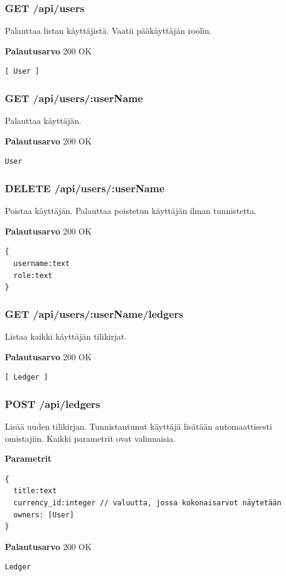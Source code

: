 \documentclass[a4paper,parskip=half]{scrartcl}
\begin{document}
\subsubsection{GET /api/users}
Palauttaa listan käyttäjistä. Vaatii pääkäyttäjän roolin.

\textbf{Palautusarvo}
200 OK
\begin{Verbatim}
[ User ]
\end{Verbatim}

\subsubsection{GET /api/users/:userName}
Palauttaa käyttäjän.

\textbf{Palautusarvo}
200 OK
\begin{Verbatim}
User
\end{Verbatim}

\subsubsection{DELETE /api/users/:userName}
Poistaa käyttäjän. Palauttaa poistetun käyttäjän ilman tunnistetta.

\textbf{Palautusarvo}
200 OK
\begin{Verbatim}
{
  username:text
  role:text
}
\end{Verbatim}

\subsubsection{GET /api/users/:userName/ledgers}
Listaa kaikki käyttäjän tilikirjat.

\textbf{Palautusarvo}
200 OK
\begin{Verbatim}
[ Ledger ]
\end{Verbatim}

\subsubsection{POST /api/ledgers}
Lisää uuden tilikirjan. Tunnistautunut käyttäjä lisätään automaattisesti
omistajiin. Kaikki parametrit ovat valinnaisia.

\textbf{Parametrit}
\begin{Verbatim}
{
  title:text
  currency_id:integer // valuutta, jossa kokonaisarvot näytetään
  owners: [User]
}
\end{Verbatim}

\textbf{Palautusarvo}
200 OK
\begin{Verbatim}
Ledger
\end{Verbatim}
\end{document}
